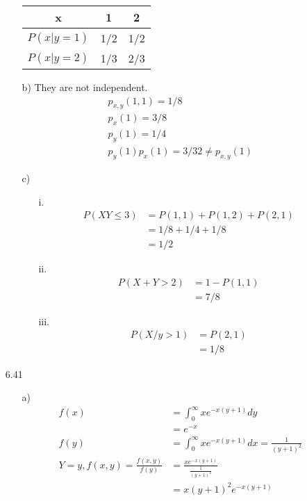 \documentclass{article}
\begin{document}
\begin{itemize}
\begin{itemize}
\begin{tabular}{c|c|c}
            x&1&2\\ \hline
            \(P(x|y=1)\)&1/2&1/2\\ \hline 
            \(P(x|y=2)\)&1/3&2/3\\
        \end{tabular}
        \item [b)] They are not independent.
        \begin{align*}
            p_{x,y}(1,1)=1/8\\
            p_x(1)=3/8\\
            p_y(1)=1/4\\
            p_y(1)p_x(1)=3/32\neq p_{x,y}(1)
        \end{align*}
        \item [c)]
        \begin{itemize}
            \item [i.]
            \begin{align*}
                P(XY\leq3)&=P(1,1)+P(1,2)+P(2,1)\\
                &=1/8+1/4+1/8\\
                &=1/2
            \end{align*}
            \item [ii.]
            \begin{align*}
                P(X+Y>2)&=1-P(1,1)\\
                &=7/8
            \end{align*}
            \item [iii.]
            \begin{align*}
                P(X/y>1)&=P(2,1)\\
                &=1/8
            \end{align*}
        \end{itemize}
    \end{itemize}
    \item [6.41]
    \begin{itemize}
        \item [a)]
        \begin{align*}
            f(x)&=\int_{0}^{\infty}xe^{-x(y+1)}dy\\
            &=e^{-x}\\
            f(y)&=\int_{0}^{\infty}xe^{-x(y+1)}dx = \frac{1}{(y+1)^2}\\
            Y=y,f(x,y)=\frac{f(x,y)}{f(y)}&=\frac{xe^{-x(y+1)}}{\frac{1}{(y+1)^2}}\\
            &=x(y+1)^2e^{-x(y+1)}\\

\end{align*}
\end{itemize}
\end{itemize}
\end{document}
